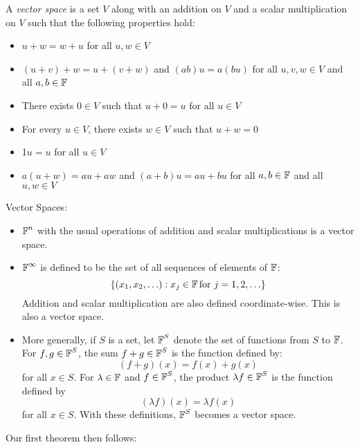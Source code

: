 \begin{definition}
    A \textit{vector space} is a set $V$ along with an addition on $V$ and a
    scalar multiplication on $V$ such that the following properties hold:

    \begin{itemize}
        \item $u + w = w + u$ for all $u, w \in V$
        \item $(u + v) + w = u + (v + w)$ and $(ab)u = a(bu)$ for all $u, v, w \in V$ and all $a, b \in \operatorname{\mathbb{F}}$
        \item There exists $0 \in V$ such that $u + 0 = u$ for all $u \in V$
        \item For every $u \in V$, there exists $w \in V$ such that $u + w = 0$
        \item 1$u = u$ for all $u \in V$
        \item $a (u + w) = au + aw$ and $(a+b)u = au + bu$ for all $a, b \in \operatorname{\mathbb{F}}$ and all $u, w \in V$
    \end{itemize}
\end{definition}

\begin{example} Vector Spaces:
    \begin{itemize}
        \item $\operatorname{\mathbb{F}}^n$ with the usual operations of addition and scalar multiplications is a vector space.
        \item $\operatorname{\mathbb{F}}^\infty$ is defined to be the set of all sequences of elements of $\operatorname{\mathbb{F}}$:
        \[ \{(x_1, x_2, \ldots) : x_j \in \operatorname{\mathbb{F}} \text{for } j = 1, 2, \ldots \} \]
        Addition and scalar multiplication are also defined coordinate-wise. This is also a vector space.
        \item More generally, if $S$ is a set, let $\operatorname{\mathbb{F}}^S$ denote the set of functions from $S$ to $\operatorname{\mathbb{F}}$.
        For $f, g \in \operatorname{\mathbb{F}}^S$, the sum $f + g \in \operatorname{\mathbb{F}}^S$ is the function defined by:
        \[ (f + g)(x)  = f(x) + g(x)\]
        for all $x \in S$.
        For $\lambda \in \operatorname{\mathbb{F}}$ and $f \in \operatorname{\mathbb{F}}^S$, the product $\lambda f \in \operatorname{\mathbb{F}}^S$ is the function defined by
        \[ (\lambda f)(x) = \lambda f(x) \]
        for all $x \in S$.
        With these definitions, $\operatorname{\mathbb{F}}^S$ becomes a vector space.
    \end{itemize}
\end{example}

Our first theorem then follows:

